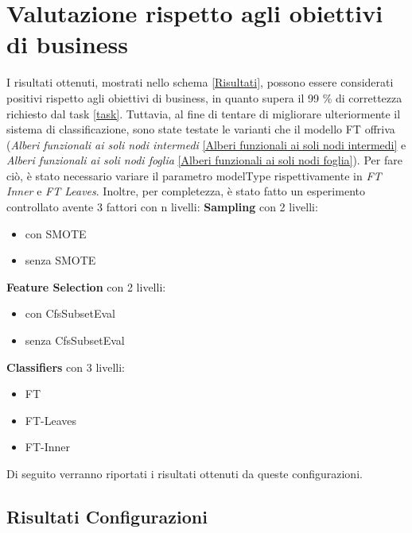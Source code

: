 \section{Valutazione rispetto agli obiettivi di business}
I risultati ottenuti, mostrati nello schema \ref{Risultati}, possono essere considerati positivi rispetto agli obiettivi di business, in quanto supera il 99 \% di correttezza richiesto dal task \ref{task}. 
Tuttavia, al fine di tentare di migliorare ulteriormente il sistema di classificazione, sono state testate le varianti che il modello FT offriva (\emph{Alberi funzionali ai soli nodi intermedi} \ref{Alberi funzionali ai soli nodi intermedi} e \emph{Alberi funzionali ai soli nodi foglia} \ref{Alberi funzionali ai soli nodi foglia}). Per fare ciò, è stato necessario variare il parametro modelType rispettivamente in \emph{FT Inner} e \emph{FT Leaves}.
Inoltre, per completezza, è stato fatto un esperimento controllato avente 3 fattori con n livelli:
\textbf{Sampling} con 2 livelli:
\begin{itemize}
	\item con SMOTE
	\item senza SMOTE
\end{itemize}
\textbf{Feature Selection} con 2 livelli:
\begin{itemize}
	\item con CfsSubsetEval
	\item senza CfsSubsetEval
\end{itemize}
\textbf{Classifiers} con 3 livelli:
\begin{itemize}
	\item FT
	\item FT-Leaves
	\item FT-Inner
\end{itemize}
Di seguito verranno riportati i risultati ottenuti da queste configurazioni. 
\subsection{Risultati Configurazioni}
